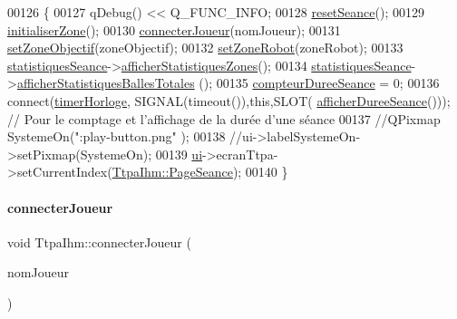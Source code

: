 \begin{DoxyCode}
00126 \{
00127     qDebug() << Q\_FUNC\_INFO;
00128     \hyperlink{class_ttpa_ihm_a521fea1cb4384157e5422a033e9a4d4f}{resetSeance}();
00129     \hyperlink{class_ttpa_ihm_a5d180e581060b01e028f44ee7bd25290}{initialiserZone}();
00130     \hyperlink{class_ttpa_ihm_a3b3eaf479e616df033680a4df42da3d7}{connecterJoueur}(nomJoueur);
00131     \hyperlink{class_ttpa_ihm_a3fd5b5d097f8a52df6fc8dd6d59b1374}{setZoneObjectif}(zoneObjectif);
00132     \hyperlink{class_ttpa_ihm_abda1a93ec09ec404b129e08876faa5f8}{setZoneRobot}(zoneRobot);
00133     \hyperlink{class_ttpa_ihm_abed6897d6f7b4d3a5eb8dcc07651e740}{statistiquesSeance}->\hyperlink{class_statistiques_seance_afd9087c34222c0b2c0db11c5a96459c4}{afficherStatistiquesZones}();
00134     \hyperlink{class_ttpa_ihm_abed6897d6f7b4d3a5eb8dcc07651e740}{statistiquesSeance}->\hyperlink{class_statistiques_seance_a216b30bcfca71e425073a7ac90e59089}{afficherStatistiquesBallesTotales}
      ();
00135     \hyperlink{class_ttpa_ihm_abb5ab7cc023685e40cb278f0210f276f}{compteurDureeSeance} = 0;
00136     connect(\hyperlink{class_ttpa_ihm_a447ad7262efa01d22bc3222e0e470087}{timerHorloge}, SIGNAL(timeout()),\textcolor{keyword}{this},SLOT(
      \hyperlink{class_ttpa_ihm_a266897eb263e584b40fc2b7c26347623}{afficherDureeSeance}())); \textcolor{comment}{// Pour le comptage et l'affichage de la durée d'une séance}
00137     \textcolor{comment}{//QPixmap SystemeOn(":play-button.png" );}
00138     \textcolor{comment}{//ui->labelSystemeOn->setPixmap(SystemeOn);}
00139     \hyperlink{class_ttpa_ihm_ad5fae1222a667da158c26f3d0f0dce23}{ui}->ecranTtpa->setCurrentIndex(\hyperlink{class_ttpa_ihm_aad886f2c7b90b4f990492092f0be9c2ba3906edb75bc60b0026a207280c4e41d0}{TtpaIhm::PageSeance});
00140 \}
\end{DoxyCode}
\mbox{\label{class_ttpa_ihm_a3b3eaf479e616df033680a4df42da3d7}} 
\paragraph{\texorpdfstring{connecter\+Joueur}{connecterJoueur}}
{\footnotesize\ttfamily void Ttpa\+Ihm\+::connecter\+Joueur (\begin{DoxyParamCaption}\item[{Q\+String}]{nom\+Joueur }\end{DoxyParamCaption})\hspace{0.3cm}{\ttfamily [slot]}}



